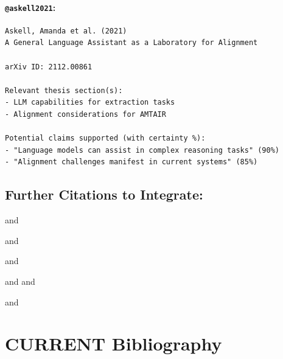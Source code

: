 \documentclass[
  11pt,
  letterpaper,
]{book}
\begin{document}
\subsubsection*{\texorpdfstring{\texttt{@askell2021}:
\textcite{askell2021}}{@askell2021: @askell2021}}\label{askell2021-askell2021}

\begin{verbatim}
Askell, Amanda et al. (2021)
A General Language Assistant as a Laboratory for Alignment

arXiv ID: 2112.00861

Relevant thesis section(s):
- LLM capabilities for extraction tasks
- Alignment considerations for AMTAIR

Potential claims supported (with certainty %):
- "Language models can assist in complex reasoning tasks" (90%)
- "Alignment challenges manifest in current systems" (85%)
\end{verbatim}

\section*{Further Citations to
Integrate:}\label{further-citations-to-integrate}


\textcite{growiec2024}

\textcite{clarke2022}

\textcite{drexler2019} and \textcite{drexler2019a}

\textcite{brundage2018} and \textcite{brundage2018a}

\textcite{kumar2019} and \textcite{kumar2019a}

\textcite{carlsmith2021} and \textcite{carlsmith2022} and
\textcite{carlsmith2024}

\textcite{hendrycks2021} and \textcite{hendrycks2021a}

\textcite{wilson2023}


\chapter*{CURRENT Bibliography}\label{current-bibliography}

\end{document}
